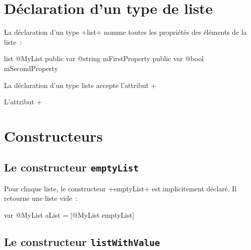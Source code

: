 



\section{Déclaration d'un type de liste}

La déclaration d'un type \ggs+list+ nomme toutes les propriétés des éléments de la liste~:

\begin{galgas}
list @MyList {
  public var @string mFirstProperty
  public var @bool mSecondProperty
}
\end{galgas}

La déclaration d'un type liste accepte l'attribut \ggs+%

L'attribut \ggs+%

\section{Constructeurs}

\subsection{Le constructeur \texttt{emptyList}}

Pour chaque liste, le constructeur \ggs+emptyList+ est implicitement déclaré. Il retourne une liste vide~:

\begin{galgas}
var @MyList aList = [@MyList emptyList]
\end{galgas}


\subsection{Le constructeur \texttt{listWithValue}}

